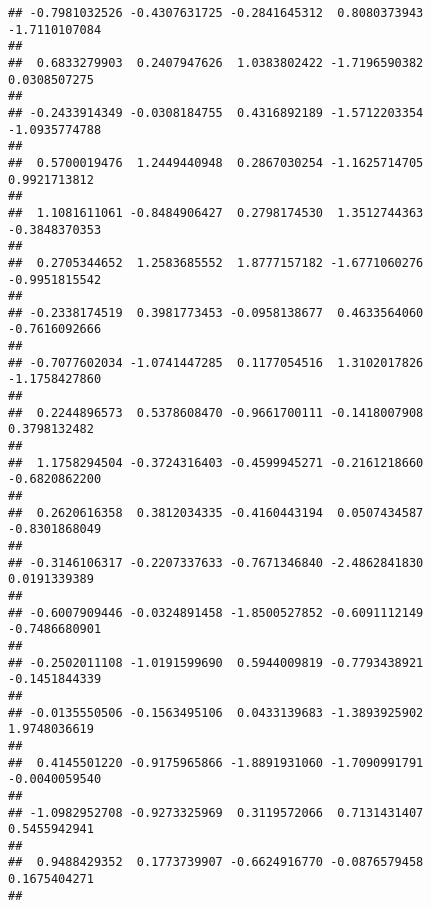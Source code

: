 \documentclass[]{article}
\begin{document}
\begin{verbatim}
## -0.7981032526 -0.4307631725 -0.2841645312  0.8080373943 -1.7110107084 
##                                                                       
##  0.6833279903  0.2407947626  1.0383802422 -1.7196590382  0.0308507275 
##                                                                       
## -0.2433914349 -0.0308184755  0.4316892189 -1.5712203354 -1.0935774788 
##                                                                       
##  0.5700019476  1.2449440948  0.2867030254 -1.1625714705  0.9921713812 
##                                                                       
##  1.1081611061 -0.8484906427  0.2798174530  1.3512744363 -0.3848370353 
##                                                                       
##  0.2705344652  1.2583685552  1.8777157182 -1.6771060276 -0.9951815542 
##                                                                       
## -0.2338174519  0.3981773453 -0.0958138677  0.4633564060 -0.7616092666 
##                                                                       
## -0.7077602034 -1.0741447285  0.1177054516  1.3102017826 -1.1758427860 
##                                                                       
##  0.2244896573  0.5378608470 -0.9661700111 -0.1418007908  0.3798132482 
##                                                                       
##  1.1758294504 -0.3724316403 -0.4599945271 -0.2161218660 -0.6820862200 
##                                                                       
##  0.2620616358  0.3812034335 -0.4160443194  0.0507434587 -0.8301868049 
##                                                                       
## -0.3146106317 -0.2207337633 -0.7671346840 -2.4862841830  0.0191339389 
##                                                                       
## -0.6007909446 -0.0324891458 -1.8500527852 -0.6091112149 -0.7486680901 
##                                                                       
## -0.2502011108 -1.0191599690  0.5944009819 -0.7793438921 -0.1451844339 
##                                                                       
## -0.0135550506 -0.1563495106  0.0433139683 -1.3893925902  1.9748036619 
##                                                                       
##  0.4145501220 -0.9175965866 -1.8891931060 -1.7090991791 -0.0040059540 
##                                                                       
## -1.0982952708 -0.9273325969  0.3119572066  0.7131431407  0.5455942941 
##                                                                       
##  0.9488429352  0.1773739907 -0.6624916770 -0.0876579458  0.1675404271 
##                                                                       

\end{verbatim}
\end{document}
